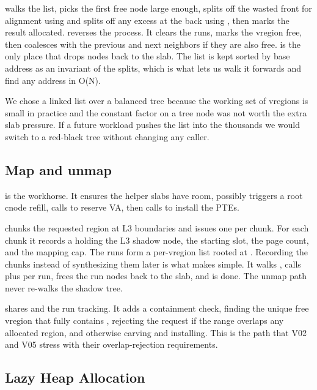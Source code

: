\medskip\noindent
{} walks the list, picks the first free node large enough, splits
off the wasted front for alignment using  and splits off any
excess at the back using , then marks the result allocated.
 reverses the process. It clears the runs, marks the vregion free,
then coalesces with the previous and next neighbors if they are also free.
 is the only place that drops nodes back to the slab. The list
is kept sorted by base address as an invariant of the splits, which is what
lets us walk it forwards and find any address in O(N).

\medskip\noindent
We chose a linked list over a balanced tree because the working set of
vregions is small in practice and the constant factor on a tree node was not worth
the extra slab pressure. If a future workload pushes the list into the
thousands we would switch to a red-black tree without changing any caller.

\subsection{Map and unmap}

 is the workhorse. It ensures the helper slabs
have room, possibly triggers a root cnode refill, calls  to
reserve VA, then calls  to install the PTEs.

\medskip\noindent
{} chunks the requested region at L3 boundaries and
issues one  per chunk. For each chunk it records a 
holding the L3 shadow node, the starting slot, the page count, and the
mapping cap. The runs form a per-vregion list rooted at .
Recording the chunks instead of synthesizing them later is what makes
 simple. It walks , calls  plus
 per run, frees the run nodes back to the slab, and is done.
The unmap path never re-walks the shadow tree.

\medskip\noindent
{} shares  and the run tracking. It
adds a containment check, finding the unique free vregion that fully contains
\co{[vaddr, vaddr+bytes)}, rejecting the request if the range overlaps any allocated
region, and otherwise carving and installing. This is the path that V02 and V05
stress with their overlap-rejection requirements.

\subsection{Lazy Heap Allocation}


